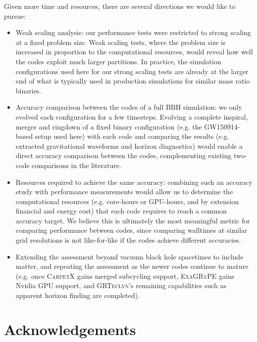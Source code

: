 \documentclass[12pt,a4paper]{article}
\numberwithin{figure}{subsection}
\newcommand{\exagrype}{\textsc{ExaGRyPE}\xspace}
\newcommand{\grteclyn}{\textsc{GRTeclyn}\xspace}
\newcommand{\carpetx}{\textsc{CarpetX}\xspace}
\begin{document}
Given more time and resources, there are several directions we would like to
pursue:
\begin{itemize}
    \item Weak scaling analysis: our performance tests were restricted to strong
    scaling at a fixed problem size. Weak scaling tests, where the problem size
    is increased in proportion to the computational resources, would reveal how
    well the codes exploit much larger partitions. In practice, the simulation
    configurations used here for our strong scaling tests are already at the
    larger end of what is typically used in production simulations for similar mass ratio binaries.
    \item Accuracy comparison between the codes of a full BBH simulation: we
    only evolved each configuration for a few timesteps. Evolving a complete
    inspiral, merger and ringdown of a fixed binary configuration (e.g. the
    GW150914-based setup used here) with each code and comparing the results
    (e.g. extracted gravitational waveforms and horizon diagnostics) would
    enable a direct accuracy comparison between the codes, complementing
    existing two-code comparisons in the literature.
    \item Resources required to achieve the same accuracy: combining such an
    accuracy study with performance measurements would allow us to determine
    the computational resources (e.g. core-hours or GPU-hours, and by
    extension financial and energy cost) that each code requires to reach a
    common accuracy target. We believe this is ultimately the most meaningful
    metric for comparing performance between codes, since comparing
    walltimes at similar grid resolutions is not like-for-like if the codes
    achieve different accuracies.
    \item Extending the assessment beyond vacuum black hole spacetimes to
    include matter, and repeating the assessment as the newer codes continue
    to mature (e.g. once \carpetx gains merged subcycling support, \exagrype
    gains Nvidia GPU support, and \grteclyn's remaining capabilities such as
    apparent horizon finding are completed).
\end{itemize}

\section*{Acknowledgements}
\end{document}
